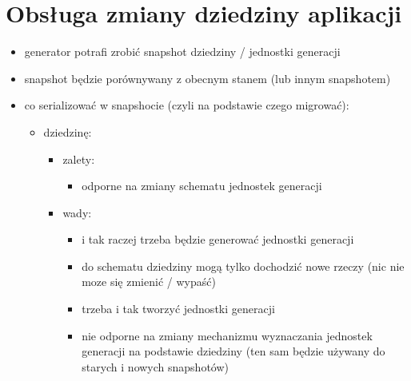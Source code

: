 \chapter{Obsługa zmiany dziedziny aplikacji} \label{chap:migrations}

\begin{itemize}
 \item generator potrafi zrobić snapshot dziedziny / jednostki generacji
 \item snapshot będzie porównywany z obecnym stanem (lub innym snapshotem)
 
 \item co serializować w snapshocie (czyli na podstawie czego migrować):
  \begin{itemize}
   
   \item dziedzinę:
    \begin{itemize}
     \item zalety:
      \begin{itemize}
       \item odporne na zmiany schematu jednostek generacji
      \end{itemize}
     \item wady:
      \begin{itemize}
       \item i tak raczej trzeba będzie generować jednostki generacji
       \item do schematu dziedziny mogą tylko dochodzić nowe rzeczy (nic nie moze się zmienić / wypaść)
       \item trzeba i tak tworzyć jednostki generacji
       \item nie odporne na zmiany mechanizmu wyznaczania jednostek generacji na podstawie dziedziny (ten sam będzie używany do starych i nowych snapshotów)
      \end{itemize}
    \end{itemize}
   

\end{itemize}
\end{itemize}
